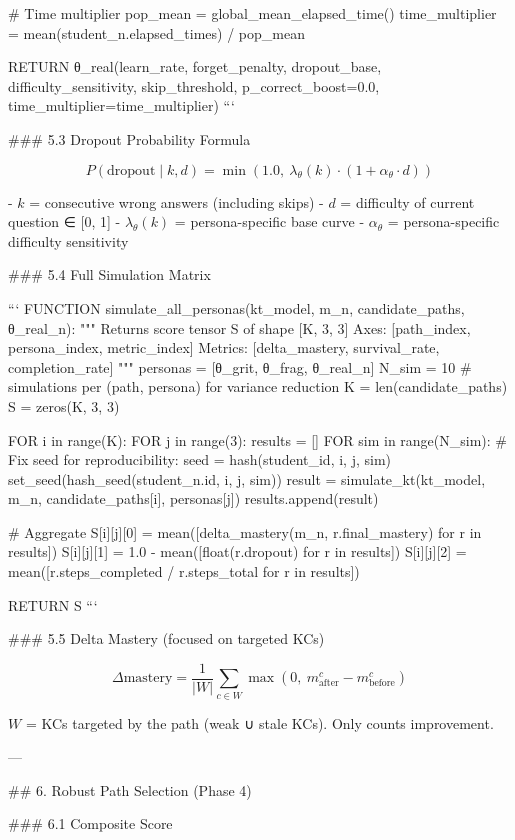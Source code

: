   # Time multiplier
  pop_mean = global_mean_elapsed_time()
  time_multiplier = mean(student_n.elapsed_times) / pop_mean

  RETURN θ_real(learn_rate, forget_penalty, dropout_base,
                difficulty_sensitivity, skip_threshold,
                p_correct_boost=0.0, time_multiplier=time_multiplier)
```

### 5.3 Dropout Probability Formula

$$P(\text{dropout} \mid k, d) = \min\left(1.0,\ \lambda_\theta(k) \cdot (1 + \alpha_\theta \cdot d)\right)$$

- $k$ = consecutive wrong answers (including skips)
- $d$ = difficulty of current question ∈ [0, 1]
- $\lambda_\theta(k)$ = persona-specific base curve
- $\alpha_\theta$ = persona-specific difficulty sensitivity

### 5.4 Full Simulation Matrix

```
FUNCTION simulate_all_personas(kt_model, m_n, candidate_paths, θ_real_n):
  """
  Returns score tensor S of shape [K, 3, 3]
  Axes: [path_index, persona_index, metric_index]
  Metrics: [delta_mastery, survival_rate, completion_rate]
  """
  personas = [θ_grit, θ_frag, θ_real_n]
  N_sim = 10  # simulations per (path, persona) for variance reduction
  K = len(candidate_paths)
  S = zeros(K, 3, 3)

  FOR i in range(K):
    FOR j in range(3):
      results = []
      FOR sim in range(N_sim):
        # Fix seed for reproducibility: seed = hash(student_id, i, j, sim)
        set_seed(hash_seed(student_n.id, i, j, sim))
        result = simulate_kt(kt_model, m_n, candidate_paths[i], personas[j])
        results.append(result)

      # Aggregate
      S[i][j][0] = mean([delta_mastery(m_n, r.final_mastery) for r in results])
      S[i][j][1] = 1.0 - mean([float(r.dropout) for r in results])
      S[i][j][2] = mean([r.steps_completed / r.steps_total for r in results])

  RETURN S
```

### 5.5 Delta Mastery (focused on targeted KCs)

$$\Delta\text{mastery} = \frac{1}{|W|} \sum_{c \in W} \max\left(0,\ m_{\text{after}}^c - m_{\text{before}}^c\right)$$

$W$ = KCs targeted by the path (weak ∪ stale KCs). Only counts improvement.

---

## 6. Robust Path Selection (Phase 4)

### 6.1 Composite Score

